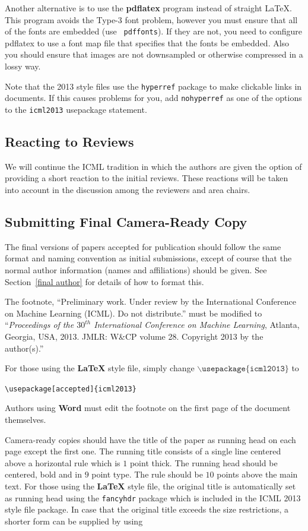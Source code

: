 \documentclass{article}
\begin{document}
Another alternative is to use the \textbf{pdflatex} program instead of
straight \LaTeX. This program avoids the Type-3 font problem, however
you must ensure that all of the fonts are embedded (use {\tt
pdffonts}). If they are not, you need to configure pdflatex to use a
font map file that specifies that the fonts be embedded. Also you
should ensure that images are not downsampled or otherwise compressed
in a lossy way.

Note that the 2013 style files use the {\tt hyperref} package to
make clickable links in documents.  If this causes problems for you,
add {\tt nohyperref} as one of the options to the {\tt icml2013}
usepackage statement.

\subsection{Reacting to Reviews}
We will continue the ICML tradition in which the authors are given the
option of providing a short reaction to the initial reviews. These
reactions will be taken into account in the discussion among the
reviewers and area chairs.

\subsection{Submitting Final Camera-Ready Copy}

The final versions of papers accepted for publication should follow the
same format and naming convention as initial submissions, except of
course that the normal author information (names and affiliations)
should be given.  See Section~\ref{final author} for details of how to
format this.

The footnote, ``Preliminary work.  Under review by the International
Conference on Machine Learning (ICML).  Do not distribute.'' must be
modified to ``\textit{Proceedings of the
$\mathit{30}^{th}$ International Conference on Machine Learning},
Atlanta, Georgia, USA, 2013.  JMLR: W\&CP volume 28. 
Copyright 2013 by the author(s).''

For those using the \textbf{\LaTeX} style file, simply change
$\mathtt{\backslash usepackage\{icml2013\}}$ to 

\verb|\usepackage[accepted]{icml2013}|

\noindent
Authors using \textbf{Word} must edit the
footnote on the first page of the document themselves.

Camera-ready copies should have the title of the paper as running head
on each page except the first one.  The running title consists of a
single line centered above a horizontal rule which is $1$ point thick.
The running head should be centered, bold and in $9$ point type.  The
rule should be $10$ points above the main text.  For those using the
\textbf{\LaTeX} style file, the original title is automatically set as running
head using the {\tt fancyhdr} package which is included in the ICML
2013 style file package.  In case that the original title exceeds the
size restrictions, a shorter form can be supplied by using
\end{document}
